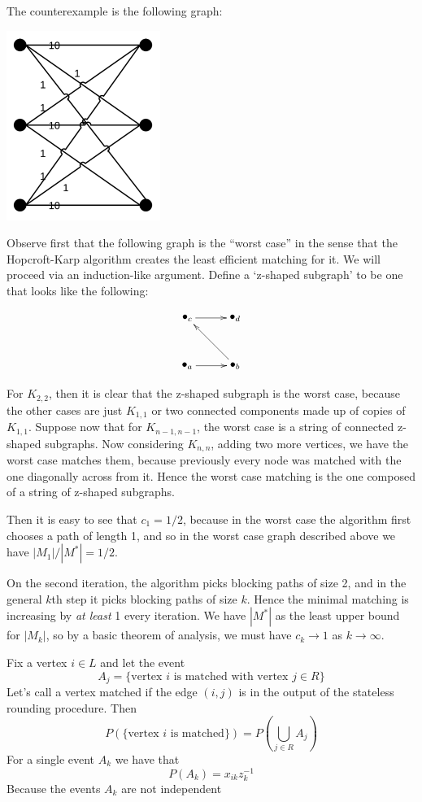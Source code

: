 \documentclass{article}
\newcommand{\problem}[1]{\noindent {\bf #1}}
\newcommand{\problempart}[1]{\noindent{\textbf{(#1)}}}
\begin{document}
\problem{Problem 1.} The counterexample is the following graph:

\includegraphics[width=50mm]{grapha.png}

\problem{Problem 2.} Observe first that the following graph is the ``worst case'' in the sense that the Hopcroft-Karp algorithm creates the least efficient matching for it. We will proceed via an induction-like argument. Define a `z-shaped subgraph' to be one that looks like the following:

\begin{displaymath}
\xygraph{
!{<0cm,0cm>;<1cm,0cm>:<0cm,1cm>::}
!{(0,0) }*+{\bullet_{a}}="a"
!{(1.5,0) }*+{\bullet_{b}}="b"
!{(0,1.5) }*+{\bullet_{c}}="c"
!{(1.5,1.5)}*+{\bullet_{d}}="d"
"a":"b"
"b":"c"
"c":"d"
}
\end{displaymath}

For $K_{2,2}$, then it is clear that the z-shaped subgraph is the worst case, because the other cases are just $K_{1,1}$ or two connected components made up of copies of $K_{1,1}$. Suppose now that for $K_{n-1,n-1}$, the worst case is a string of connected z-shaped subgraphs. Now considering $K_{n,n}$, adding two more vertices, we have the worst case matches them, because previously every node was matched with the one diagonally across from it. Hence the worst case matching is the one composed of a string of z-shaped subgraphs.

Then it is easy to see that $c_1=1/2$, because in the worst case the algorithm first chooses a path of length 1, and so in the worst case graph described above we have $|M_1|/|M^{\ast}|=1/2$.



On the second iteration, the algorithm picks blocking paths of size 2, and in the general $k$th step it picks blocking paths of size $k$. Hence the minimal matching is increasing by \emph{at least} 1 every iteration. We have $|M^{\ast}|$ as the least upper bound for $|M_k|$, so by a basic theorem of analysis, we must have $c_k\to 1$ as $k\to\infty$.

\problem{Problem 4.} 
\problempart{a} Fix a vertex $i \in L$ and let the event
\[
A_j = \{\text{vertex } i \text{ is matched with vertex } j \in R\}
\] 
Let's call a vertex matched if the edge $(i,j)$ is in the output of the stateless rounding procedure. Then 
\[
P(\{\text{vertex } i \text{ is matched}\}) = P( \bigcup_{j\in R} A_j )
\]
For a single event $A_k$ we have that 
\[
P(A_k) = x_{ik}z_k^{-1}
\]
Because the events $A_k$ are not independent
\end{document}
